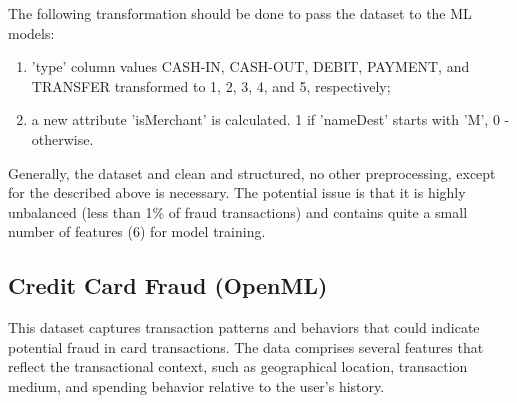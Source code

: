 \documentclass[12pt,a4paper, hidelinks]{article}
\begin{document}
The following transformation should be done to pass the dataset to the ML models:
\begin{enumerate}
    \item 'type' column values CASH-IN, CASH-OUT, DEBIT, PAYMENT, and TRANSFER transformed to 1, 2, 3, 4, and 5, respectively;
    \item a new attribute 'isMerchant' is calculated. 1 if 'nameDest' starts with 'M', 0 - otherwise.
\end{enumerate}

Generally, the dataset and clean and structured, no other preprocessing, except for the described above is necessary. The potential issue is that it is highly unbalanced (less than 1\% of fraud transactions) and contains quite a small number of features (6) for model training. 


\subsection{Credit Card Fraud (OpenML)}

This dataset captures transaction patterns and behaviors that could indicate potential fraud in card transactions. The data comprises several features that reflect the transactional context, such as geographical location, transaction medium, and spending behavior relative to the user's history.
\end{document}
